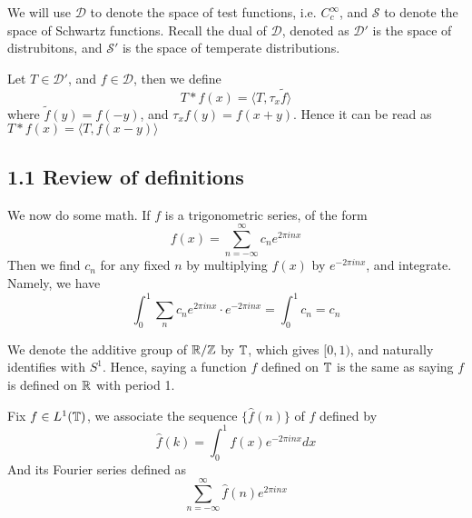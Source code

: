 We will use $\mathcal{D}$ to denote the space of test functions, i.e. $C_c^\infty$, and $\mathcal{S}$ to denote the space of Schwartz functions. Recall the dual of $\mathcal{D}$, denoted as $\mathcal{D}'$ is the space of distrubitons, and $\mathcal{S}'$ is the space of temperate distributions.

\begin{definition}
    Let $T\in\mathcal{D}'$, and $f\in\mathcal{D}$, then we define
    \begin{equation*}
        T\ast f(x)=\langle T, \tau_x\tilde{f}\rangle
    \end{equation*}
    where $\tilde{f}(y)=f(-y)$, and $\tau_xf(y)=f(x+y)$. Hence it can be read as $T\ast f(x)=\langle T, f(x-y)\rangle$
\end{definition}
\begin{comment}
The theory of distribution will come in when we need meaningful differentiation but derivatives don't exist in the classical sense.
\end{comment}
\begin{comment}
    Tradionally, functions are thought of as sending points to points, but distributions are linear functions that act on a test function and send it to a point. In other words, distributions send functions to points using $\phi\mapsto\int u\phi dx$.
\end{comment}

\subsection{1.1 Review of definitions}
We now do some math.
If $f$ is a trigonometric series, of the form
\begin{equation*}
    f(x)=\sum_{n=-\infty}^\infty c_ne^{2\pi inx}
\end{equation*}
Then we find $c_n$ for any fixed $n$ by multiplying $f(x)$ by $e^{-2\pi inx}$, and integrate. Namely, we have
\begin{equation*}
    \int_0^1\sum_nc_ne^{2\pi inx}\cdot e^{-2\pi inx}=\int_0^1 c_n=c_n
\end{equation*}

We denote the additive group of $\mathbb{R}/\mathbb{Z}$ by $\mathbb{T}$, which gives $[0,1)$, and naturally identifies with $S^1$. Hence, saying a function $f$ defined on $\mathbb{T}$ is the same as saying $f$ is defined on $\mathbb{R}$ with period 1.

\begin{definition}
    Fix $f\in L^1(\mathbb{T})$, we associate the sequence $\{\hat{f}(n)\}$ of $f$ defined by
    \begin{equation*}
        \hat{f}(k)=\int_0^1f(x)e^{-2\pi inx}dx
    \end{equation*}
    And its Fourier series defined as
    \begin{equation*}
        \sum_{n=-\infty}^\infty \hat{f}(n)e^{2\pi inx}
    \end{equation*}
\end{definition}


